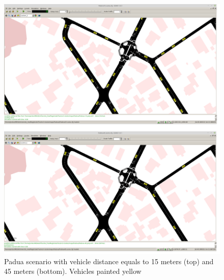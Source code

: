 		\begin{figure}[H]
			\centering
			\includegraphics[width=\textwidth]{immagini/sumo-distances}
			\caption{Padua scenario with vehicle distance equals to 15 meters (top) and 45 meters (bottom). Vehicles painted yellow}
			\label{fig:sumo-distances}
		\end{figure}


